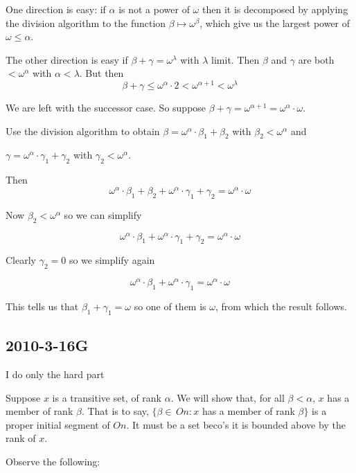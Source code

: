 \documentclass{book}
\begin{document}
One direction is easy: if $\alpha$ is not a power of $\omega$ then it
is decomposed by applying the division algorithm to the function
$\beta \mapsto \omega^\beta$, which give us the largest power of
$\omega \leq \alpha$.

\smallskip

The other direction is easy if $\beta + \gamma = \omega^\lambda$ with
$\lambda$ limit. Then $\beta$ and $\gamma$ are both $< \omega^\alpha$
with $\alpha < \lambda$.  But then
$$\beta+\gamma\leq\omega^\alpha\cdot 2< \omega^{\alpha+1} < \omega^\lambda$$

We are left with the successor case.  So suppose $\beta + \gamma =
\omega^{\alpha + 1} = \omega^\alpha \cdot \omega$.  

Use the division algorithm to obtain $\beta = \omega^\alpha \cdot \beta_1 + \beta_2$ with $\beta_2 < \omega^\alpha$ and

$\gamma = \omega^\alpha \cdot \gamma_1 + \gamma_2$ with $\gamma_2 < \omega^\alpha$.

Then $$\omega^\alpha \cdot \beta_1 + \beta_2 + \omega^\alpha \cdot \gamma_1 + \gamma_2 = \omega^\alpha \cdot \omega$$

Now $\beta_2 < \omega^\alpha$ so we can simplify
 
$$\omega^\alpha \cdot \beta_1 + \omega^\alpha \cdot \gamma_1 + \gamma_2 = \omega^\alpha \cdot \omega$$

Clearly $\gamma_2 = 0$ so we simplify again

$$\omega^\alpha \cdot \beta_1 + \omega^\alpha \cdot \gamma_1 = \omega^\alpha \cdot \omega$$

This tells us that $\beta_1 + \gamma_1 = \omega$ so one of them is $\omega$, from which the result follows.


\subsection*{2010-3-16G}

I do only the hard part

\medskip

Suppose $x$ is a transitive set, of rank $\alpha$.  We will show that,
for all $\beta < \alpha$, $x$ has a member of rank $\beta$.  That is
to say, $\{\beta\in\,On:x$ has a member of rank $\beta\}$ is a proper
initial segment of $On$.  It must be a set beco's it is bounded above
by the rank of $x$.

\smallskip

Observe the following:
\end{document}
